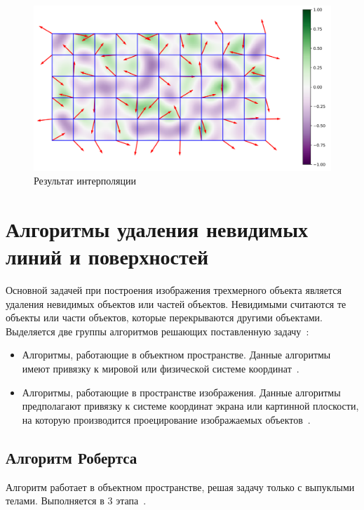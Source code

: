 \documentclass[a4paper, 14pt]{extreport}
\begin{document}
\begin{figure}[h]
	\centering
	\includegraphics[scale=0.4]{tools/perling_3.png}
	\caption{Результат интерполяции}
	\label{analytic:p3}
\end{figure}

\clearpage\section{Алгоритмы удаления невидимых линий и поверхностей}

Основной задачей при построения изображения трехмерного объекта является удаления невидимых объектов или частей
объектов. Невидимыми считаются те объекты или части объектов, которые перекрываются другими объектами. Выделяется
две группы алгоритмов решающих поставленную задачу~\cite{rodjers}:
\begin{itemize}
	\item Алгоритмы, работающие в объектном пространстве. Данные алгоритмы имеют привязку к мировой или физической 
	системе координат~\cite{rodjers}.
	\item Алгоритмы, работающие в пространстве изображения. Данные алгоритмы предполагают привязку к системе 	
	координат экрана или картинной плоскости, на которую производится проецирование изображаемых 
	объектов~\cite{rodjers}.
\end{itemize}

\subsection{Алгоритм Робертса}

Алгоритм работает в объектном пространстве, решая задачу только с выпуклыми телами. Выполняется в 3 этапа~\cite{rodjers}. 
\end{document}
